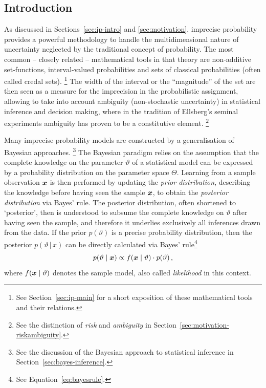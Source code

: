 
\subsection{Introduction}
\label{sec:jstp-intro}

As discussed in Sections~\ref{sec:ip-intro} and \ref{sec:motivation},
imprecise probability %
provides a powerful methodology to handle the multidimensional
nature of uncertainty %
neglected by the traditional concept of probability. The most common
-- closely related -- mathematical tools in that theory are
non-additive set-functions, interval-valued probabilities and sets
of classical probabilities (often called credal sets).%
\footnote{See Section~\ref{sec:ip-main} for a short exposition of these mathematical tools and their relations.}
The width of the interval or the ``magnitude'' of the set are then seen as a
measure for the imprecision in the probabilistic assignment,
allowing to take into account ambiguity (non-stochastic uncertainty)
in statistical inference and decision making, where in the
tradition of Ellsberg's \parencite*{1961:ellsberg} seminal
experiments ambiguity has proven to be a constitutive element.%
\footnote{See the distinction of \emph{risk} and \emph{ambiguity} in Section~\ref{sec:motivation-riskambiguity}.}

Many imprecise probability models are constructed by a
generalisation of Bayes\-ian approaches.%
\footnote{See the discussion of the Bayesian approach to statistical inference in
Section~\ref{sec:bayes-inference}.}
The Bayesian paradigm
relies on the assumption that the complete knowledge on the
parameter $\vartheta$ of a statistical model can be expressed by a
probability distribution on the parameter space $\Theta$. Learning
from a sample observation ${\bm x}$ is then performed by updating the
\emph{prior distribution}, describing the knowledge before having
seen the sample ${\bm x}$, to obtain the \emph{posterior distribution} via
Bayes' rule. The posterior distribution, often shortened to
`posterior', then is understood to subsume the complete
knowledge on $\vartheta$ after having seen the sample, and therefore
it underlies exclusively all inferences drawn from the data. If the
prior $p(\vartheta)$ is a precise probability distribution, then the
posterior $p(\vartheta\,|\,x)$ can be directly calculated via Bayes'
rule\footnote{See Equation~\eqref{eq:bayesrule}.} %
\begin{equation*}%
p(\vartheta\mid\x) \propto f(\x\mid\vartheta) \cdot p(\vartheta)\,,%
\end{equation*}
where $f({\bm x}\mid\vartheta)$ denotes the sample model, also called
\emph{likelihood} in this context.

